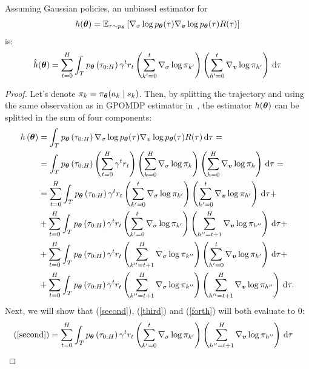 \begin{theorem}
Assuming Gaussian policies, an unbiased estimator for 
\begin{align}
h(\vtheta) = \EV[\tau\sim p_{\vtheta}]{\score{\sigma}\score{\vv}R(\tau)}
\end{align}
is:
\begin{equation}
\hat{h}(\vtheta) =  \sum_{t=0}^{H}\int_{T}p_{\vtheta}\left(\tau_{0:H}\right)\gamma^{t}r_{t}\left(\gradlogsumpi{k'}{0}{t}{\sigma} \right)\left(\gradlogsumpi{h'}{0}{t}{\vv} \right)\de\tau
\end{equation}
\end{theorem}
\begin{proof}
Let's denote $\pi_k = \pi_{\vtheta}(a_k \mid s_k)$. Then, by splitting the trajectory and using the same observation as in GPOMDP estimator in~\cite{peters}, the estimator $h(\vtheta)$ can be splitted in the sum of four components:
\begin{align}
h\left({\vtheta}\right) &= \int_T p_{\vtheta}\left(\tau_{0:H}\right)\score[\vtheta]{\sigma} \score[\vtheta]{\vv}R(\tau)\de\tau \notag
= \\&=
\int_{T}p_{\vtheta}\left(\tau_{0:H}\right)\left(\sum_{t=0}^{H}\gamma^{t}r_t\right)\left(\gradlogsumpi{k}{0}{H}{\sigma}\right)\left(\gradlogsumpi{h}{0}{H}{\vv}\right) \de\tau \notag 
=\\&=
 \sum_{t=0}^{H}\int_{T}p_{\vtheta}\left(\tau_{0:H}\right)\gamma^{t}r_{t}\left(\gradlogsumpi{k'}{0}{t}{\sigma} \right)\left(\gradlogsumpi{h'}{0}{t}{\vv} \right)\de\tau  \label{first} 
+\\&+ 
\sum_{t=0}^{H}\int_{T}p_{\vtheta}\left(\tau_{0:H}\right)\gamma^{t}r_{t}\left(\gradlogsumpi{k'}{0}{t}{\sigma} \right)\left(\gradlogsumpi{h''}{t+1}{H}{\vv} \right)\de\tau  \label{second} 
+\\&+ 
\sum_{t=0}^{H}\int_{T}p_{\vtheta}\left(\tau_{0:H}\right)\gamma^{t}r_{t}\left(\gradlogsumpi{k''}{t+1}{H}{\sigma} \right)\left(\gradlogsumpi{h'}{0}{t}{\vv} \right)\de\tau  \label{third} 
+\\&+ 
\sum_{t=0}^{H}\int_{T}p_{\vtheta}\left(\tau_{0:H}\right)\gamma^{t}r_{t}\left(\gradlogsumpi{k''}{t+1}{H}{\sigma} \right)\left(\gradlogsumpi{h''}{t+1}{H}{\vv} \right)\de\tau.  \label{forth}
 \end{align}
Next, we will show that (\ref{second}), (\ref{third}) and (\ref{forth}) will both evaluate to $0$:
\allowdisplaybreaks
\small
\begin{align*}
&(\ref{second})
=
\sum_{t=0}^{H}\int_{T}p_{\vtheta}\left(\tau_{0:H}\right)\gamma^{t}r_{t}\left(\gradlogsumpi{k'}{0}{t}{\sigma} \right)\left(\gradlogsumpi{h''}{t+1}{H}{\vv} \right)\de\tau 

\end{align*}
\end{proof}
